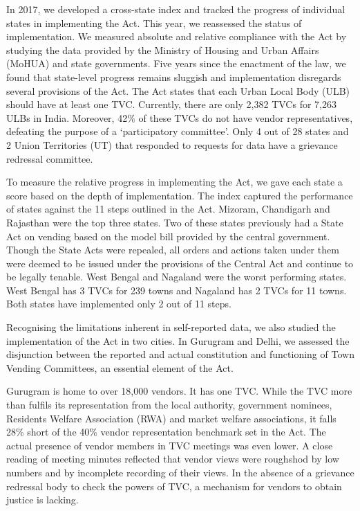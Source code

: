 \documentclass[a4paper, 12pt, twoside]{article}
\begin{document}
{In 2017, we developed a cross-state index and tracked the progress of individual states in implementing the Act. This year, we reassessed the status of implementation. We measured absolute and relative compliance with the Act by studying the data provided by the Ministry of Housing and Urban Affairs (MoHUA) and state governments. Five years since the enactment of the law, we found that state-level progress remains sluggish and implementation disregards several provisions of the Act. The Act states that each Urban Local Body (ULB) should have at least one TVC. Currently, there are only 2,382 TVCs for 7,263 ULBs in India. Moreover, 42\% of these TVCs do not have vendor representatives, defeating the purpose of a ‘participatory committee’. Only 4 out of 28 states and 2 Union Territories (UT) that responded to requests for data have a grievance redressal committee.

To measure the relative progress in implementing the Act, we gave each state a score based on the depth of implementation. The index captured the performance of states against the 11 steps outlined in the Act. Mizoram, Chandigarh and Rajasthan were the top three states. Two of these states previously had a State Act on vending based on the model bill provided by the central government. Though the State Acts were repealed, all orders and actions taken under them were deemed to be issued under the provisions of the Central Act and continue to be legally tenable. West Bengal and Nagaland were the worst performing states. West Bengal has 3 TVCs for 239 towns and Nagaland has 2 TVCs for 11 towns. Both states have implemented only 2 out of 11 steps. %

Recognising the limitations inherent in self-reported data, we also studied the implementation of the Act in two cities. In Gurugram and Delhi, we assessed the disjunction between the reported and actual constitution and functioning of Town Vending Committees, an essential element of the Act. 

Gurugram is home to over 18,000 vendors. It has one TVC. While the TVC more than fulfils its representation from the local authority, government nominees, Residents Welfare Association (RWA) and market welfare associations, it falls 28\% short of the 40\% vendor representation benchmark set in the Act. The actual presence of vendor members in TVC meetings was even lower. A close reading of meeting minutes reflected that vendor views were roughshod by low numbers and by incomplete recording of their views. In the absence of a grievance redressal body to check the powers of TVC, a mechanism for vendors to obtain justice is lacking. 

}
\end{document}
